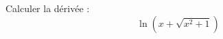 Calculer la d\'eriv\'ee :
\begin{displaymath}
 \ln\left( x+\sqrt{x^2+1}\right) 
\end{displaymath}
\bigskip

